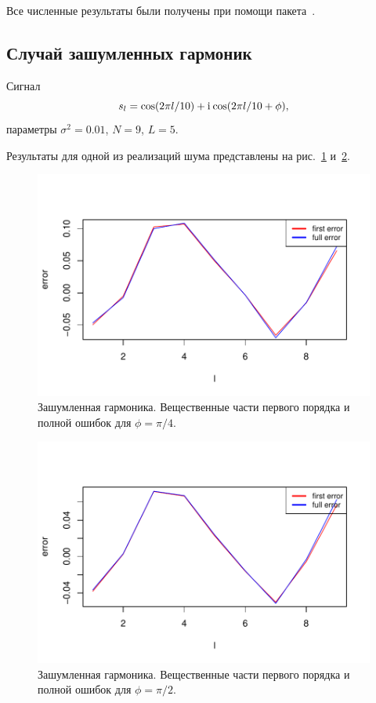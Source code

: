 \documentclass[specialist,
               substylefile = spbu.rtx,
               subf,href,colorlinks=true, 12pt]{disser}
\begin{document}
Все численные результаты были получены при помощи пакета~\cite{Korobeynikov.etal2014}.

\subsection{Случай зашумленных гармоник}
Сигнал
$$s_l = \cos(2 \pi l / 10) + \mathrm{i}\mkern1mu\cos(2 \pi l / 10 + \phi),$$
параметры $\sigma^2 = 0.01$, $N = 9$, $L = 5$.

Результаты для одной из реализаций шума представлены на рис.~\ref{fig:harm_noise_pi_4} и~\ref{fig:harm_noise_pi_2}.

\begin{figure}[H]
	\begin{center}
		\includegraphics[width=0.6\linewidth]{img/first_vs_full_re.pdf}
		\caption{Зашумленная гармоника. Вещественные части первого порядка и полной ошибок для $\phi = \pi / 4$.}
		\label{fig:harm_noise_pi_4}
	\end{center}
\end{figure}

\begin{figure}[H]
	\begin{center}
		\includegraphics[width=0.6\linewidth]{img/first_vs_full_re_2.pdf}
		\caption{Зашумленная гармоника. Вещественные части первого порядка и полной ошибок для $\phi = \pi / 2$.}
		\label{fig:harm_noise_pi_2}
	\end{center}
\end{figure}
\end{document}
